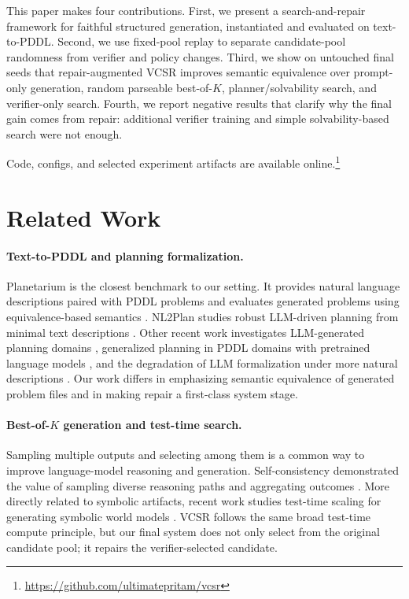 \documentclass[11pt]{article}
\newcommand{\vcsr}{\textsc{VCSR}\xspace}
\newcommand{\pddl}{\textsc{PDDL}\xspace}
\begin{document}
This paper makes four contributions. First, we present a search-and-repair
framework for faithful structured generation, instantiated and evaluated on
text-to-\pddl. Second, we use fixed-pool replay to separate candidate-pool
randomness from verifier and policy changes. Third, we show on untouched final
seeds that repair-augmented \vcsr improves semantic equivalence over
prompt-only generation, random parseable best-of-$K$, planner/solvability
search, and verifier-only search. Fourth, we report negative results that
clarify why the final gain comes from repair: additional verifier training and
simple solvability-based search were not enough.

Code, configs, and selected experiment artifacts are available
online.\footnote{\url{https://github.com/ultimatepritam/vcsr}}

\section{Related Work}

\paragraph{Text-to-\pddl and planning formalization.}
Planetarium is the closest benchmark to our setting. It provides natural
language descriptions paired with \pddl problems and evaluates generated
problems using equivalence-based semantics \citep{zuo2024planetarium}. NL2Plan
studies robust LLM-driven planning from minimal text descriptions
\citep{gestrin2024nl2plan}. Other recent work investigates LLM-generated
planning domains \citep{oswald2024planningdomains}, generalized planning in
\pddl domains with pretrained language models
\citep{silver2024generalizedplanning}, and the degradation of LLM
formalization under more natural descriptions
\citep{huang2024planningformalizers}. Our work differs in emphasizing semantic
equivalence of generated problem files and in making repair a first-class
system stage.

\paragraph{Best-of-$K$ generation and test-time search.}
Sampling multiple outputs and selecting among them is a common way to improve
language-model reasoning and generation. Self-consistency demonstrated the
value of sampling diverse reasoning paths and aggregating outcomes
\citep{wang2023selfconsistency}. More directly related to symbolic artifacts,
recent work studies test-time scaling for generating symbolic world models
\citep{yu2025symbolicworldmodels}. \vcsr follows the same broad test-time
compute principle, but our final system does not only select from the original
candidate pool; it repairs the verifier-selected candidate.
\end{document}
